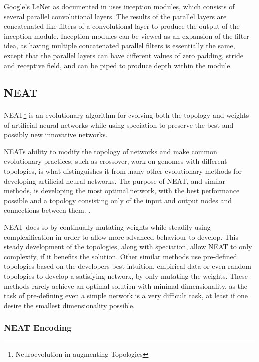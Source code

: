 Google's LeNet as documented in \cite{christian} uses inception modules, which consists of several parallel convolutional layers. The results of the parallel layers are concatenated like filters of a convolutional layer to produce the output of the inception module. Inception modules can be viewed as an expansion of the filter idea, as having multiple concatenated parallel filters is essentially the same, except that the parallel layers can have different values of zero padding, stride and receptive field, and can be piped to produce depth within the module.

\subsection{NEAT}
\label{sec:neat}
NEAT\footnote{Neuroevolution in augmenting Topologies} is an evolutionary algorithm for evolving both the topology and weights of artificial neural networks while using speciation to preserve the best and possibly new innovative networks.

NEATs ability to modify the topology of networks and make common evolutionary practices, such as crossover, work on genomes with different topologies, is what distinguishes it from many other evolutionary methods for developing artificial neural networks. The purpose of NEAT, and similar methods, is developing the most optimal network, with the best performance possible and a topology consisting only of the input and output nodes and connections between them. . 

NEAT does so by continually mutating weights while steadily using complexification in order to allow more advanced behaviour to develop. This steady development of the topologies, along with speciation, allow NEAT to only complexify, if it benefits the solution. 
Other similar methods use pre-defined topologies based on the developers best intuition, empirical data or even random topologies to develop a satisfying network, by only mutating the weights. These methods rarely achieve an optimal solution with minimal dimensionality, as the task of pre-defining even a simple network is a very difficult task, at least if one desire the smallest dimensionality possible.

\subsubsection{NEAT Encoding}


